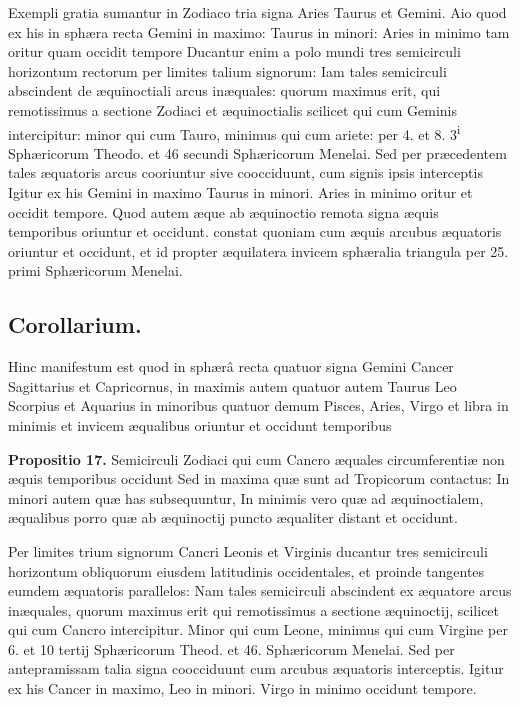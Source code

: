 \documentclass[11pt,a4paper]{article}
\begin{document}
Exempli gratia sumantur in Zodiaco tria signa Aries Taurus et Gemini. Aio quod ex his in sphæra recta Gemini in maximo: Taurus in minori: Aries in minimo tam oritur quam occidit tempore Ducantur enim a polo mundi tres semicirculi horizontum rectorum per limites talium signorum: Iam tales semicirculi abscindent de æquinoctiali arcus inæquales: quorum maximus erit, qui remotissimus a sectione Zodiaci et æquinoctialis scilicet qui cum Geminis intercipitur: minor qui cum Tauro, minimus qui cum ariete: per 4. et 8. 3\textsuperscript{i} Sphæricorum Theodo. et 46 secundi Sphæricorum Menelai. Sed per præcedentem tales æquatoris arcus cooriuntur sive coocciduunt, cum signis ipsis interceptis Igitur ex his Gemini in maximo Taurus in minori. Aries in minimo oritur et occidit tempore. Quod autem æque ab æquinoctio remota signa æquis temporibus oriuntur et occidunt. constat quoniam cum æquis arcubus æquatoris oriuntur et occidunt,  et id propter æquilatera invicem sphæralia triangula per 25. primi Sphæricorum Menelai.

\subsection*{Corollarium.}

Hinc manifestum est quod in sphærâ recta quatuor signa Gemini Cancer Sagittarius et Capricornus, in maximis autem quatuor autem Taurus Leo Scorpius et Aquarius in minoribus quatuor demum Pisces, Aries, Virgo et libra in minimis et invicem æqualibus oriuntur et occidunt temporibus

\textbf{Propositio 17.} Semicirculi Zodiaci qui cum Cancro æquales circumferentiæ non æquis temporibus occidunt Sed in maxima quæ sunt ad Tropicorum contactus: In minori autem quæ has subsequuntur, In minimis vero quæ ad æquinoctialem, æqualibus porro quæ ab æquinoctij puncto æqualiter distant et occidunt.

Per limites trium signorum Cancri Leonis et Virginis ducantur tres semicirculi horizontum obliquorum eiusdem latitudinis occidentales, et proinde tangentes eumdem æquatoris parallelos: Nam tales semicirculi abscindent ex æquatore arcus inæquales, quorum maximus erit qui remotissimus a sectione æquinoctij, scilicet qui cum Cancro intercipitur. Minor qui cum Leone, minimus qui cum Virgine per 6. et 10 tertij Sphæricorum Theod. et 46. Sphæricorum Menelai. Sed per antepramissam talia signa coocciduunt cum arcubus æquatoris interceptis. Igitur ex his Cancer in maximo, Leo in minori. Virgo in minimo occidunt tempore.
\end{document}
